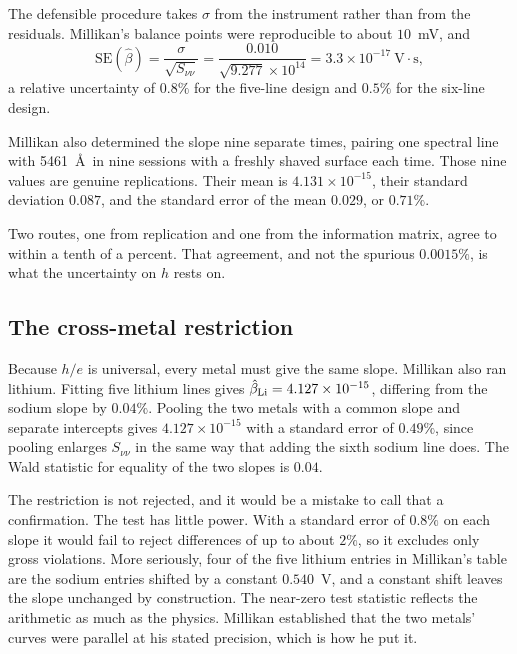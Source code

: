 \documentclass[11pt]{article}
\begin{document}
The defensible procedure takes $\sigma$ from the instrument rather than from
the residuals.  Millikan's balance points were reproducible to about
$10$~mV, and
\begin{equation}\label{eq:se}
  \mathrm{SE}(\hat\beta) = \frac{\sigma}{\sqrt{S_{\nu\nu}}}
  = \frac{0.010}{\sqrt{9.277}\times10^{14}} = 3.3\times10^{-17}~
  \text{V}\cdot\text{s},
\end{equation}
a relative uncertainty of $0.8\%$ for the five-line design and $0.5\%$ for the
six-line design.

Millikan also determined the slope nine separate times, pairing one spectral
line with 5461~\AA\ in nine sessions with a freshly shaved surface each time.
Those nine values are genuine replications.  Their mean is
$4.131\times10^{-15}$, their standard deviation $0.087$, and the standard
error of the mean $0.029$, or $0.71\%$.

Two routes, one from replication and one from the information matrix, agree to
within a tenth of a percent.  That agreement, and not the spurious $0.0015\%$,
is what the uncertainty on $h$ rests on.

\subsection*{The cross-metal restriction}

Because $h/e$ is universal, every metal must give the same slope.  Millikan
also ran lithium.  Fitting five lithium lines gives
$\hat\beta_{\rm Li} = 4.127\times10^{-15}$, differing from the sodium slope by
$0.04\%$.  Pooling the two metals with a common slope and separate intercepts
gives $4.127\times10^{-15}$ with a standard error of $0.49\%$, since pooling
enlarges $S_{\nu\nu}$ in the same way that adding the sixth sodium line does.
The Wald statistic for equality of the two slopes is $0.04$.

The restriction is not rejected, and it would be a mistake to call that a
confirmation.  The test has little power.  With a standard error of $0.8\%$ on
each slope it would fail to reject differences of up to about $2\%$, so it
excludes only gross violations.  More seriously, four of the five lithium
entries in Millikan's table are the sodium entries shifted by a constant
$0.540$~V, and a constant shift leaves the slope unchanged by construction.
The near-zero test statistic reflects the arithmetic as much as the physics.
Millikan established that the two metals' curves were parallel at his stated
precision, which is how he put it.
\end{document}

